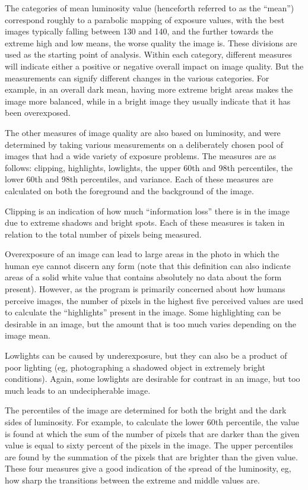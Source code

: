 \documentclass[twocolumn]{article}
\begin{document}
The categories of mean luminosity value (henceforth referred to as the “mean”) correspond roughly to a parabolic mapping of exposure values, with the best images typically falling between 130 and 140, and the further towards the extreme high and low means, the worse quality the image is. These divisions are used as the starting point of analysis. Within each category, different measures will indicate either a positive or negative overall impact on image quality. But the measurements can signify different changes in the various categories. For example, in an overall dark mean, having more extreme bright areas makes the image more balanced, while in a bright image they usually indicate that it has been overexposed.

The other measures of image quality are also based on luminosity, and were determined by taking various measurements on a deliberately chosen pool of images that had a wide variety of exposure problems. The measures are as follows: clipping, highlights, lowlights, the upper 60th and 98th percentiles, the lower 60th and 98th percentiles, and variance. Each of these measures are calculated on both the foreground and the background of the image.

Clipping is an indication of how much “information loss” there is in the image due to extreme shadows and bright spots. Each of these measures is taken in relation to the total number of pixels being measured.

Overexposure of an image can lead to large areas in the photo in which the human eye cannot discern any form (note that this definition can also indicate areas of a solid white value that contains absolutely no data about the form present). However, as the program is primarily concerned about how humans perceive images, the number of pixels in the highest five perceived values are used to calculate the “highlights” present in the image. Some highlighting can be desirable in an image, but the amount that is too much varies depending on the image mean.

Lowlights can be caused by underexposure, but they can also be a product of poor lighting (eg, photographing a shadowed object in extremely bright conditions). Again, some lowlights are desirable for contrast in an image, but too much leads to an undecipherable image.

The percentiles of the image are determined for both the bright and the dark sides of luminosity. For example, to calculate the lower 60th percentile, the value is found at which the sum of the number of pixels that are darker than the given value is equal to sixty percent of the pixels in the image. The upper percentiles are found by the summation of the pixels that are brighter than the given value. These four measures give a good indication of the spread of the luminosity, eg, how sharp the transitions between the extreme and middle values are.
\end{document}
